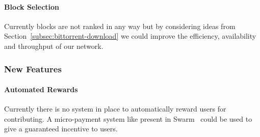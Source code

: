 \paragraph*{Block Selection}
Currently blocks are not ranked in any way but by considering ideas from Section~\ref{subsec:bittorrent-download} we could improve the efficiency, availability and throughput of our network.

\subsubsection*{New Features}

\paragraph*{Automated Rewards}
Currently there is no system in place to automatically reward users for contributing. A micro-payment system like present in Swarm~\cite{hartman_swarm_1999} could be used to give a guaranteed incentive to users.